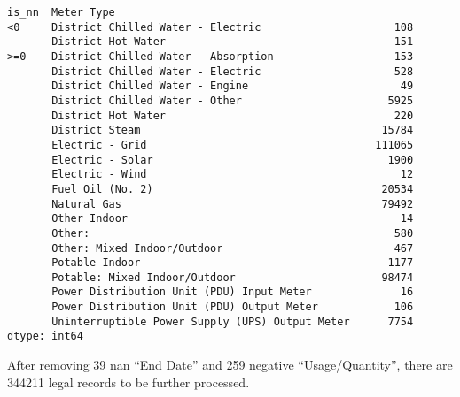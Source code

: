 \documentclass[12pt]{article}
\begin{document}
\begin{verbatim}
is_nn  Meter Type                                     
<0     District Chilled Water - Electric                     108
       District Hot Water                                    151
>=0    District Chilled Water - Absorption                   153
       District Chilled Water - Electric                     528
       District Chilled Water - Engine                        49
       District Chilled Water - Other                       5925
       District Hot Water                                    220
       District Steam                                      15784
       Electric - Grid                                    111065
       Electric - Solar                                     1900
       Electric - Wind                                        12
       Fuel Oil (No. 2)                                    20534
       Natural Gas                                         79492
       Other Indoor                                           14
       Other:                                                580
       Other: Mixed Indoor/Outdoor                           467
       Potable Indoor                                       1177
       Potable: Mixed Indoor/Outdoor                       98474
       Power Distribution Unit (PDU) Input Meter              16
       Power Distribution Unit (PDU) Output Meter            106
       Uninterruptible Power Supply (UPS) Output Meter      7754
dtype: int64
\end{verbatim}
After removing 39 nan ``End Date'' and 259 negative
``Usage/Quantity'', there are 344211 legal records to be further
processed.

\pagebreak
\end{document}
